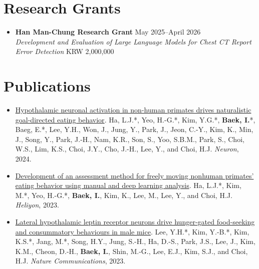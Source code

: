 \documentclass[10pt, a4paper]{article}
\newenvironment{customitemize}
	{\begin{itemize}[leftmargin=*, noitemsep, topsep=0pt, label=$\cdot$]}
	{\end{itemize}}
\begin{document}
\section*{Research Grants}
\begin{customitemize}
    \item \textbf{Han Man-Chung Research Grant} \hfill May 2025--April 2026 \\
    \textit{Development and Evaluation of Large Language Models for Chest CT Report Error Detection} \hfill KRW 2,000,000
\end{customitemize}

\section*{Publications}
\begin{customitemize}
    \item \href{https://doi.org/10.1016/j.neuron.2024.03.029}{\color{mycolor} Hypothalamic neuronal activation in non-human primates drives naturalistic goal-directed eating behavior}. Ha, L.J.*, Yeo, H.-G.*, Kim, Y.G.*, \textbf{\color{mycolor} Baek, I.}*, Baeg, E.*, Lee, Y.H., Won, J., Jung, Y., Park, J., Jeon, C.-Y., Kim, K., Min, J., Song, Y., Park, J.-H., Nam, K.R., Son, S., Yoo, S.B.M., Park, S., Choi, W.S., Lim, K.S., Choi, J.Y., Cho, J.-H., Lee, Y., and Choi, H.J. \textit{Neuron}, 2024.
    
    \item \href{https://doi.org/10.1016/j.heliyon.2024.e25561}{\color{mycolor} Development of an assessment method for freely moving nonhuman primates' eating behavior using manual and deep learning analysis}. Ha, L.J.*, Kim, M.*, Yeo, H.-G.*, \textbf{\color{mycolor} Baek, I.}, Kim, K., Lee, M., Lee, Y., and Choi, H.J. \textit{Heliyon}, 2023.
    
    \item \href{https://doi.org/10.1038/s41467-023-37044-4}{\color{mycolor} Lateral hypothalamic leptin receptor neurons drive hunger-gated food-seeking and consummatory behaviours in male mice}. Lee, Y.H.*, Kim, Y.-B.*, Kim, K.S.*, Jang, M.*, Song, H.Y., Jung, S.-H., Ha, D.-S., Park, J.S., Lee, J., Kim, K.M., Cheon, D.-H., \textbf{\color{mycolor} Baek, I.}, Shin, M.-G., Lee, E.J., Kim, S.J., and Choi, H.J. \textit{Nature Communications}, 2023.
\end{customitemize}
\begin{flushright}
    \vspace{-10pt}{\footnotesize *: Equal contribution}
\end{flushright}
\end{document}
